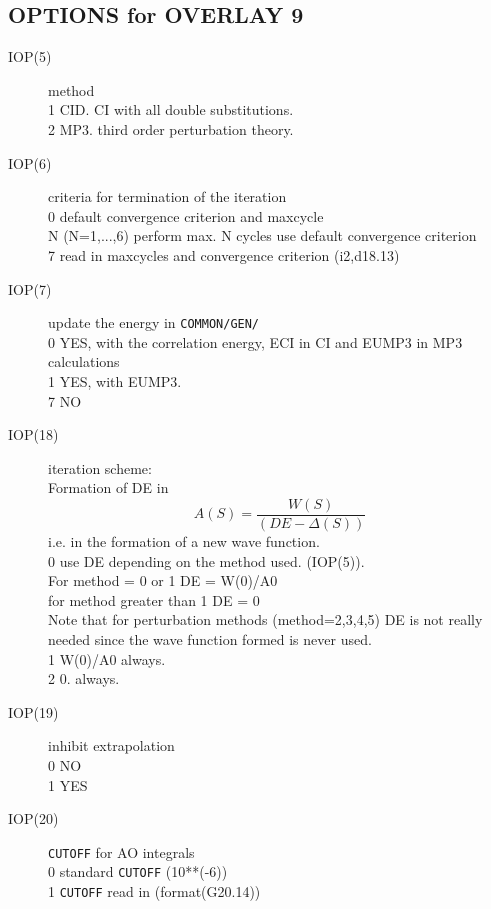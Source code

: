\subsection{\sf OPTIONS for OVERLAY 9}
\begin{description}
\item[IOP(5)]  method  \\
1  CID. CI with all double substitutions. \\
2  MP3. third order perturbation theory. \\
\item[IOP(6)]  criteria for termination of the iteration \\
0  default convergence criterion and maxcycle \\
N (N=1,...,6) perform max. N cycles
use default convergence criterion  \\
7  read in maxcycles and convergence criterion (i2,d18.13) \\
\item[IOP(7)]  update the energy in {\tt COMMON/GEN/} \\
0  YES, with the correlation energy, ECI in CI 
and EUMP3 in MP3 calculations  \\
1  YES, with EUMP3. \\
7  NO \\
\item[IOP(18)]  iteration scheme:   \\
Formation of DE in
\[
 A(S) = \frac{W(S)}{(DE - \Delta(S))}
\]
i.e. in the formation of a new wave function.  \\
0  use DE depending on the method used. (IOP(5)). \\
For method = 0 or 1  DE = W(0)/A0  \\
for method greater than 1  DE = 0  \\
Note that for perturbation methods (method=2,3,4,5)
DE is not really needed since the wave function formed is
never  used.  \\
1  W(0)/A0 always. \\
2  0. always. \\
\item[IOP(19)]  inhibit extrapolation  \\
0  NO \\
1  YES \\
\item[IOP(20)]  {\tt CUTOFF} for AO integrals  \\
0  standard {\tt CUTOFF} (10**(-6)) \\
1  {\tt CUTOFF} read in (format(G20.14)) \\

\end{description}
